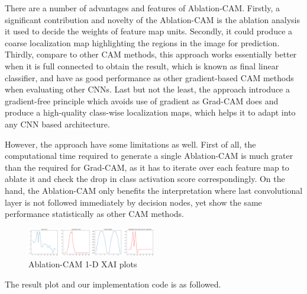 \documentclass[conference]{IEEEtran}
\begin{document}
There are a number of advantages and features of Ablation-CAM. Firstly, a significant contribution and novelty of the Ablation-CAM is the ablation analysis it used to decide the weights of feature map units. Secondly, it could produce a coarse localization map highlighting the regions in the image for prediction. Thirdly, compare to other CAM methods, this approach works essentially better when it is full connected to obtain the result, which is known as final linear classifier, and have as good performance as other gradient-based CAM methods when evaluating other CNNs. Last but not the least, the approach introduce a gradient-free principle which avoids use of gradient as Grad-CAM does and produce a high-quality class-wise localization maps, which helps it to adapt into any CNN based architecture.\par
However, the approach have some limitations as well. First of all, the computational time required to generate a single Ablation-CAM is much grater than the required for Grad-CAM, as it has to iterate over each feature map to ablate it and check the drop in class activation score correspondingly. 
On the hand, the Ablation-CAM only benefits the interpretation where last convolutional layer is not followed immediately by decision nodes, yet show the same performance statistically as other CAM methods.\par

\begin{figure}[h] 
    \centering
    \includegraphics[width=0.5\textwidth]{abd.png}
    \caption{Ablation-CAM 1-D XAI plots} 
\end{figure}

The result plot and our implementation code is as followed.
\end{document}
